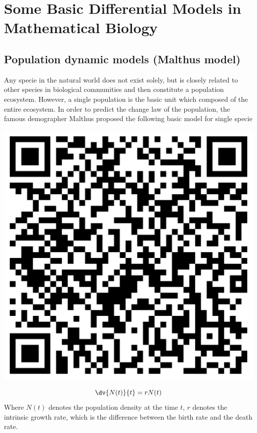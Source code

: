 \section{Some Basic Differential Models in Mathematical Biology}
\subsection{Population dynamic models (Malthus model)}

\begin{minipage}{0.75\textwidth}
Any specie in the natural world does not exist solely, 
but is closely related to other species in biological 
communities and then constitute a population ecosystem. 
However,        a single population is the basic unit which 
composed of the entire ecosystem. In order to predict 
the change law of the population, the famous demographer 
Malthus proposed the following basic model for single 
specie
\end{minipage}
\begin{minipage}{0.25\textwidth}
        \hspace*{1cm}\includegraphics[scale=.08]{Biomath_link.png}
    \end{minipage}
\begin{equation}
        \dv{N(t)}{t} =rN(t)
\end{equation}
Where $N(t)$ denotes the population density at the time $t$, $r$ denotes the intrinsic growth rate, which is the difference between the birth rate and the death rate.

